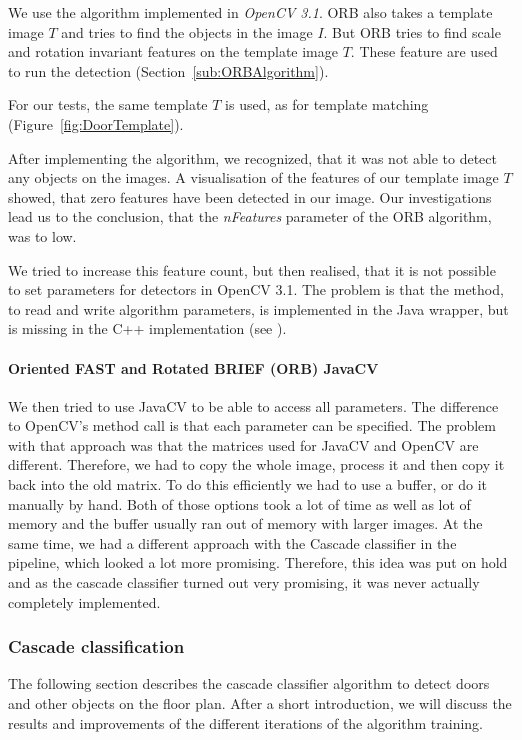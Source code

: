 We use the algorithm implemented in \textit{OpenCV 3.1}. ORB also takes a template image $T$ and tries to find the objects in the image $I$. But ORB tries to find scale and rotation invariant features on the template image $T$. These feature are used to run the detection (Section~\ref{sub:ORBAlgorithm}). 

For our tests, the same template $T$ is used, as for template matching (Figure~\ref{fig:DoorTemplate}).

After implementing the algorithm, we recognized, that it was not able to detect any objects on the images. A visualisation of the features of our template image $T$ showed, that zero features have been detected in our image. Our investigations lead us to the conclusion, that the \textit{nFeatures} parameter of the ORB algorithm, was to low.

We tried to increase this feature count, but then realised, that it is not possible to set parameters for detectors in OpenCV 3.1. The problem is that the method, to read and write algorithm parameters, is implemented in the Java wrapper, but is missing in the C++ implementation (see \citep{orb}).

\paragraph{Oriented FAST and Rotated BRIEF (ORB) JavaCV}
\label{sub:ImpORBJVCV}
We then tried to use JavaCV to be able to access all parameters. The difference to OpenCV's method call is that each parameter can be specified. The problem with that approach was that the matrices used for JavaCV and OpenCV are different. Therefore, we had to copy the whole image, process it and then copy it back into the old matrix. To do this efficiently we had to use a buffer, or do it manually by hand. Both of those options took a lot of time as well as lot of memory and the buffer usually ran out of memory with larger images. At the same time, we had a different approach with the Cascade classifier in the pipeline, which looked a lot more promising. Therefore, this idea was put on hold and as the cascade classifier turned out very promising, it was never actually completely implemented.

\subsubsection{Cascade classification}
\label{sub:ImpCascadeClassifier}
The following section describes the cascade classifier algorithm to detect doors and other objects on the floor plan. After a short introduction, we will discuss the results and improvements of the different iterations of the algorithm training.

